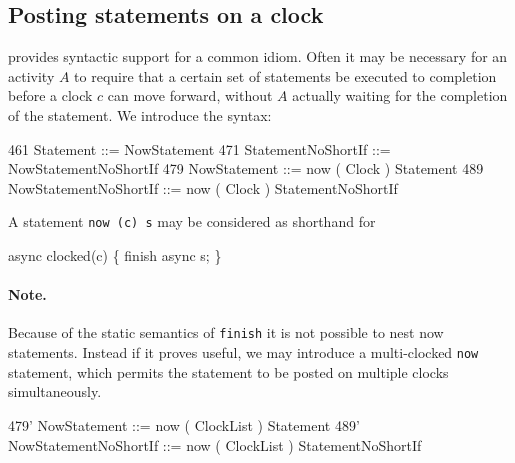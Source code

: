 \subsection{Posting statements on a clock}\label{sec:clock:now}
\Xten{} provides syntactic support for a common idiom. Often it may be
necessary for an activity $A$ to require that a certain set of
statements be executed to completion before a clock $c$ can move
forward, without $A$ actually waiting for the completion
of the statement. We introduce the syntax:
\begin{x10}
461 Statement ::= NowStatement
471 StatementNoShortIf ::= 
       NowStatementNoShortIf
479 NowStatement ::= 
       now ( Clock ) Statement
489 NowStatementNoShortIf ::= 
       now ( Clock ) StatementNoShortIf
\end{x10}
\noindent 

A statement {\tt now (c) s} may be considered as shorthand for
\begin{x10}
  async clocked(c) \{ 
     finish async s; 
  \}
\end{x10}

\paragraph{Note.} Because of the static semantics of {\tt finish}
it is not possible to nest {\cf now} statements. Instead if it proves
useful, we may introduce a multi-clocked {\tt now} statement,
which permits the statement to be posted on multiple clocks
simultaneously.
\begin{x10}
479' NowStatement ::= 
       now ( ClockList ) Statement
489' NowStatementNoShortIf ::= 
       now ( ClockList ) StatementNoShortIf  
\end{x10}
